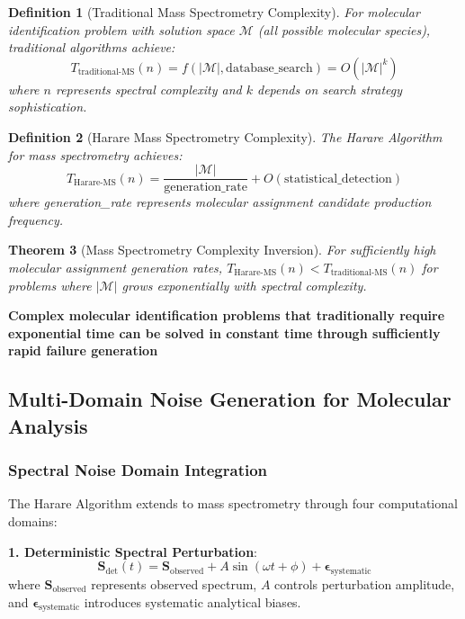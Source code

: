 \documentclass[11pt,a4paper]{article}
\newtheorem{theorem}{Theorem}[section]
\newtheorem{definition}[theorem]{Definition}
\theoremstyle{remark}
\begin{document}
\begin{definition}[Traditional Mass Spectrometry Complexity]
For molecular identification problem with solution space $\mathcal{M}$ (all possible molecular species), traditional algorithms achieve:
$$T_{\text{traditional-MS}}(n) = f(|\mathcal{M}|, \text{database\_search}) = O(|\mathcal{M}|^k)$$
where $n$ represents spectral complexity and $k$ depends on search strategy sophistication.
\end{definition}

\begin{definition}[Harare Mass Spectrometry Complexity]
The Harare Algorithm for mass spectrometry achieves:
$$T_{\text{Harare-MS}}(n) = \frac{|\mathcal{M}|}{\text{generation\_rate}} + O(\text{statistical\_detection})$$
where generation\_rate represents molecular assignment candidate production frequency.
\end{definition}

\begin{theorem}[Mass Spectrometry Complexity Inversion]
For sufficiently high molecular assignment generation rates, $T_{\text{Harare-MS}}(n) < T_{\text{traditional-MS}}(n)$ for problems where $|\mathcal{M}|$ grows exponentially with spectral complexity.
\end{theorem}

\textbf{Complex molecular identification problems that traditionally require exponential time can be solved in constant time through sufficiently rapid failure generation}

\subsection{Multi-Domain Noise Generation for Molecular Analysis}

\subsubsection{Spectral Noise Domain Integration}

The Harare Algorithm extends to mass spectrometry through four computational domains:

\textbf{1. Deterministic Spectral Perturbation}:
\begin{equation}
\mathbf{S}_{\text{det}}(t) = \mathbf{S}_{\text{observed}} + A \sin(\omega t + \phi) + \boldsymbol{\epsilon}_{\text{systematic}}
\end{equation}
where $\mathbf{S}_{\text{observed}}$ represents observed spectrum, $A$ controls perturbation amplitude, and $\boldsymbol{\epsilon}_{\text{systematic}}$ introduces systematic analytical biases.
\end{document}
